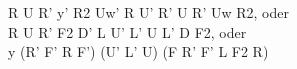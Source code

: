 R U R' y' R2 Uw' R U' R' U R' Uw R2, oder\\
R U R' F2 D' L U' L' U L' D F2, oder\\
y (R' F' R F') (U' L' U) (F R' F' L F2 R)\\
